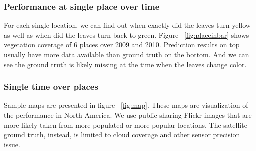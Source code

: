 \subsubsection{Performance at single place over time}
For each single location, we can find out when exactly did the leaves turn yellow as well as when
did the leaves turn back to green. 
Figure ~\ref{fig:placeinbar} shows vegetation coverage of 6 places over 2009 and 2010. 
Prediction results on top usually have more data available than ground truth on the bottom. 
And we can see the ground truth is likely missing at the time when the leaves change color. 



\subsubsection{Single time over places}

Sample maps are presented in figure ~\ref{fig:map}. These maps are visualization of the performance
in North America.
We use public sharing Flickr images that are more likely taken from more populated or more popular locations. 
The satellite ground truth, instead, is limited to cloud coverage and other sensor precision issue.





